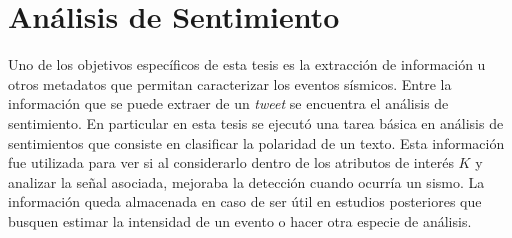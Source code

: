 %

\section{Análisis de Sentimiento}
\label{sec:sentimiento}

Uno de los objetivos específicos de esta tesis es la extracción de información u otros metadatos que permitan caracterizar los eventos sísmicos. 
%
Entre la información que se puede extraer de un \textit{tweet} se encuentra el análisis de sentimiento.
%
En particular en esta tesis se ejecutó una tarea básica en análisis de sentimientos que consiste en clasificar la polaridad de un texto.
%
Esta información fue utilizada para ver si al considerarlo dentro de los atributos de interés $K$ y analizar la señal asociada, mejoraba la detección cuando ocurría un sismo. 
%
La información queda almacenada en caso de ser útil en estudios posteriores que busquen estimar la intensidad de un evento o hacer otra especie de análisis. 


